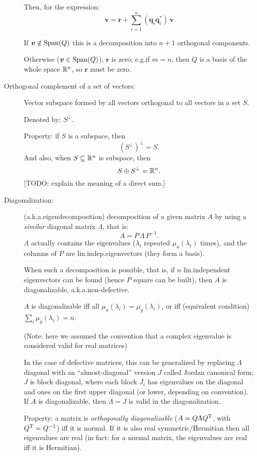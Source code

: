 \documentclass[
  12pt,
  paper=a4,
]{scrartcl} %
\begin{document}
\begin{description}
Then, for the expression:
\[
\bm v = \bm r + \sum_{i=1}^{n}(\bm q_i \bm q_i^*)\,\bm v
\]

If $\bm v \notin \operatorname{Span}(Q)$ this is a decomposition into $n+1$ orthogonal components.

Otherwise ($\bm v \in \operatorname{Span}(Q)$), $\bm r$ is zero; e.g.\@ if $m=n$, then $Q$ is a basis of the whole space $\mathbb R^n$, so $\bm r$ must be zero.


\item[Orthogonal complement of a set of vectors:] 

Vector subspace formed by all vectors orthogonal to all vectors in a set $S$.

Denoted by: $S^\perp$.

Property: if $S$ is a subspace, then \[(S^\perp)^\perp = S.\]
And also, when $S\subseteq \mathbb R^n$ is subspace, then
\[ S \oplus S^\perp = \mathbb R^n.\]
[TODO: explain the meaning of a direct sum.]


\item[Diagonalization:] 
(a.k.a.\@ eigendecomposition) decomposition of a given matrix $A$ by using a \emph{similar} diagonal matrix $\Lambda$, that is:
\[\boxed{A = P\,\Lambda\,P^{-1}}.\] $\Lambda$ actually contains the eigenvalues ($\lambda_i$ repeated $\mu_a(\lambda_i)$ times), and the columns of $P$ are lin.\@ indep.\@ eigenvectors (they form a basis).

When such a decomposition is possible, that is, if $n$ lin.\@ independent eigenvectors can be found (hence $P$ square can be built), then $A$ is diagonalizable, a.k.a.\@ non-defective.

$A$ is diagonalizable iff all $\mu_a(\lambda_i)=\mu_g(\lambda_i)$, or iff (equivalent condition) $\sum_i\mu_g(\lambda_i)=n$.

(Note: here we assumed the convention that a complex eigenvalue is considered valid for real matrices)

In the case of defective matrices, this can be generalized by replacing $\Lambda$ diagonal with an ``almost-diagonal'' version $J$ called Jordan canonical form; $J$ is block diagonal, where each block $J_i$ has eigenvalues on the diagonal and ones on the first upper diagonal (or lower, depending on convention). If $A$ is diagonalizable, then $\Lambda=J$ is valid in the diagonalization.

Property: a matrix is \emph{orthogonally diagonalizable} ($A=Q\Lambda Q^{\mathrm{T}}$, with $Q^{\mathrm{T}}=Q^{-1}$) iff it is normal. If it is also real symmetric/Hermitian then all eigenvalues are real (in fact: for a normal matrix, the eigenvalues are real iff it is Hermitian).

\end{description}
\end{document}
